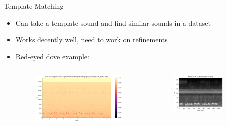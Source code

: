 \begin{frame}{Template Matching}
    \begin{itemize}
        \item Can take a template sound and find similar sounds in a dataset
        \item Works decently well, need to work on refinements
        \item Red-eyed dove example:
        \begin{columns}
            \begin{column}{0.5\textwidth}
                \begin{figure}
                    \centering
                    \includegraphics[height=1.0\textheight,width=1.0\textwidth,keepaspectratio]{images/dove_stft_spectrogram.png}
                \end{figure}
            \end{column}
            \begin{column}{0.5\textwidth}
                \begin{figure}
                    \centering
                    \includegraphics[height=0.8\textheight,width=0.8\textwidth,keepaspectratio]{images/template_matching_ex.png}
                \end{figure}
            \end{column}
        \end{columns}
    \end{itemize}
\end{frame}

